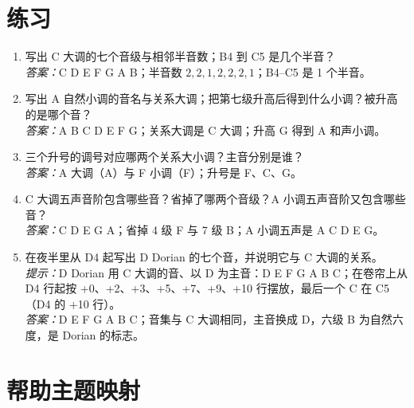 \section{练习}


\begin{exercise}
\begin{enumerate}
  \item 写出 C 大调的七个音级与相邻半音数；B4 到 C5 是几个半音？\\
  \emph{答案：}C D E F G A B；半音数 \(2,2,1,2,2,2,1\)；B4–C5 是 1 个半音。

  \item 写出 A 自然小调的音名与关系大调；把第七级升高后得到什么小调？被升高的是哪个音？\\
  \emph{答案：}A B C D E F G；关系大调是 C 大调；升高 G 得到 A 和声小调。

  \item 三个升号的调号对应哪两个关系大小调？主音分别是谁？\\
  \emph{答案：}A 大调（A）与 F\sharpsym{} 小调（F\sharpsym）；升号是 F\sharpsym、C\sharpsym、G\sharpsym。

  \item C 大调五声音阶包含哪些音？省掉了哪两个音级？A 小调五声音阶又包含哪些音？\\
  \emph{答案：}C D E G A；省掉 4 级 F 与 7 级 B；A 小调五声是 A C D E G。

  \item 在夜半里从 D4 起写出 D Dorian 的七个音，并说明它与 C 大调的关系。\\
  \emph{提示：}D Dorian 用 C 大调的音、以 D 为主音：D E F G A B C；在卷帘上从 D4 行起按 +0、+2、+3、+5、+7、+9、+10 行摆放，最后一个 C 在 C5（D4 的 +10 行）。\\
  \emph{答案：}D E F G A B C；音集与 C 大调相同，主音换成 D，六级 B 为自然六度，是 Dorian 的标志。
\end{enumerate}
\end{exercise}

\section{帮助主题映射}

